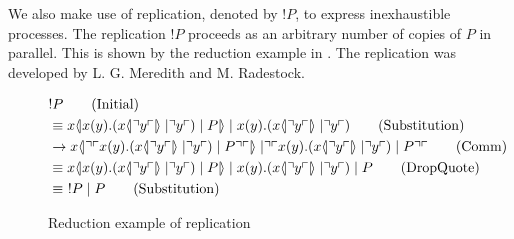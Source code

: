 We also make use of replication, denoted by $!P$, to express inexhaustible processes.
The replication $!P$ proceeds as an arbitrary number of copies of $P$ in parallel. This is shown by the reduction example in . The replication was developed by L. G. Meredith and M. Radestock\citep{Meredith2005}.






\begin{figure}[h]
    \begin{align}
        &!P \tag{Initial} \\
        &\equiv \lift{x}{\inp{x}{y}(\lift{x}{\drop{y}}\para\drop{y})\para P}\para\inp{x}{y}(\lift{x}{\drop{y}}\para \drop{y}) \tag{Substitution} \\
        &\ra \lift{x}{\drop{\quot{\inp{x}{y}(\lift{x}{\drop{y}}\para\drop{y})\para P}}}\para\drop{\quot{\inp{x}{y}(\lift{x}{\drop{y}}\para\drop{y})\para P}} \tag{Comm}\\
        &\equiv \lift{x}{\inp{x}{y}(\lift{x}{\drop{y}}\para\drop{y})\para P}\para\inp{x}{y}(\lift{x}{\drop{y}}\para \drop{y})\para P \tag{DropQuote} \\
        &\equiv\ 
        !P\para P \tag{Substitution}
    \end{align}
    \caption{Reduction example of replication}
    \label{fig:reductionexample}
\end{figure}

\FloatBarrier